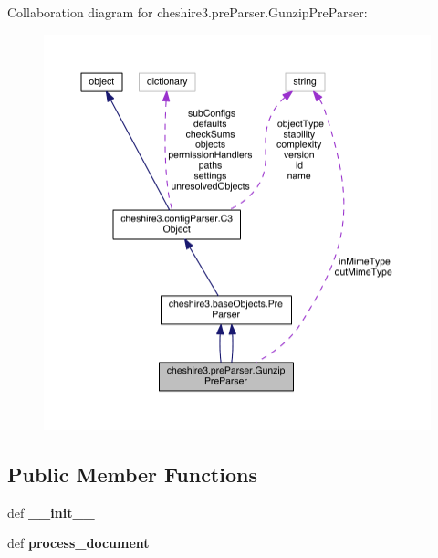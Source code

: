 Collaboration diagram for cheshire3.\-pre\-Parser.\-Gunzip\-Pre\-Parser\-:
\nopagebreak
\begin{figure}[H]
\begin{center}
\leavevmode
\includegraphics[width=350pt]{classcheshire3_1_1pre_parser_1_1_gunzip_pre_parser__coll__graph}
\end{center}
\end{figure}
\subsection*{Public Member Functions}
\begin{DoxyCompactItemize}
\item 
\hypertarget{classcheshire3_1_1pre_parser_1_1_gunzip_pre_parser_ae412c9165fa2291e6ff1feeeb0f28960}{def {\bfseries \-\_\-\-\_\-init\-\_\-\-\_\-}}\label{classcheshire3_1_1pre_parser_1_1_gunzip_pre_parser_ae412c9165fa2291e6ff1feeeb0f28960}

\item 
\hypertarget{classcheshire3_1_1pre_parser_1_1_gunzip_pre_parser_a9e06155ccc3695a30f833906af59b55f}{def {\bfseries process\-\_\-document}}\label{classcheshire3_1_1pre_parser_1_1_gunzip_pre_parser_a9e06155ccc3695a30f833906af59b55f}

\end{DoxyCompactItemize}
